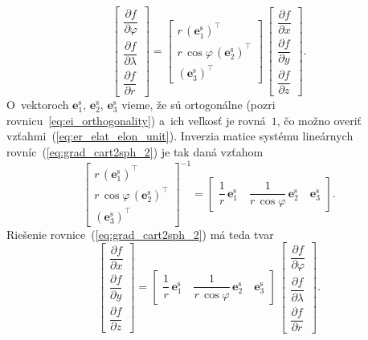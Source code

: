 \documentclass[a4paper, 12pt]{book}
\let\vec\mathbf
\begin{document}
\begin{equation}
\label{eq:grad_cart2sph_2}
\begin{bmatrix}
\dfrac{\partial f}{\partial \varphi}\\[2ex]
\dfrac{\partial f}{\partial \lambda}\\[2ex]
\dfrac{\partial f}{\partial r}
\end{bmatrix}
%
=
%
\begin{bmatrix}
r \, \left( \vec e^\mathrm{s}_1\right)^\top\\
r \, \cos\varphi \, \left(\vec e^\mathrm{s}_2\right)^\top\\
\left(\vec e^\mathrm{s}_3\right)^\top
\end{bmatrix}
%
\,
%
\begin{bmatrix}
\dfrac{\partial f}{\partial x}\\[2ex]
\dfrac{\partial f}{\partial y}\\[2ex]
\dfrac{\partial f}{\partial z}
\end{bmatrix}
%
{.}
\end{equation}
%
O~vektoroch $\vec e^\mathrm{s}_1$, $\vec e^\mathrm{s}_2$, $\vec e^\mathrm{s}_3$ 
vieme, že sú ortogonálne (pozri rovnicu~\ref{eq:ei_orthogonality}) a~ich 
veľkosť je rovná~$1$, čo možno overiť vzťahmi~(\ref{eq:er_elat_elon_unit}).  
Inverzia matice systému lineárnych rovníc~(\ref{eq:grad_cart2sph_2}) je tak 
daná vzťahom \parencite{MichelLectures}
%
\begin{equation}
\begin{bmatrix}
r \, \left( \vec e^\mathrm{s}_1 \right)^\top\\[2ex]
r \, \cos\varphi \, \left( \vec e^\mathrm{s}_2 \right)^\top\\[2ex]
\left( \vec e^\mathrm{s}_3 \right)^\top
\end{bmatrix}^{-1}
%
=
%
\begin{bmatrix}
\dfrac{1}{r} \, \vec e^\mathrm{s}_1 \quad \dfrac{1}{r \, \cos\varphi} \, \vec 
e^\mathrm{s}_2 \quad \vec e^\mathrm{s}_3
\end{bmatrix}
{.}
\end{equation}
%
Riešenie rovnice~(\ref{eq:grad_cart2sph_2}) má teda tvar
%
\begin{equation}
\label{eq:grad_cart2sph_3}
\begin{bmatrix}
\dfrac{\partial f}{\partial x}\\[2ex]
\dfrac{\partial f}{\partial y}\\[2ex]
\dfrac{\partial f}{\partial z}
\end{bmatrix}
%
=
%
\begin{bmatrix}
\dfrac{1}{r} \, \vec e^\mathrm{s}_1 \quad \dfrac{1}{r \, \cos\varphi} \, \vec 
e^\mathrm{s}_2 \quad \vec e^\mathrm{s}_3
\end{bmatrix}
%
\,
%
\begin{bmatrix}
\dfrac{\partial f}{\partial \varphi}\\[2ex]
\dfrac{\partial f}{\partial \lambda}\\[2ex]
\dfrac{\partial f}{\partial r}
\end{bmatrix}
%
{.}
\end{equation}
\end{document}
